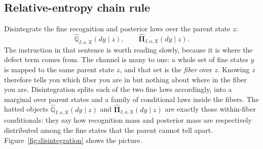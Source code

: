 \documentclass[11pt,letterpaper]{article}
\newcommand{\Rec}{\mathbb Q}
\newcommand{\Post}{\boldsymbol\Pi}
\begin{document}
\subsection{Relative-entropy chain rule}

Disintegrate the fine recognition and posterior laws over the parent state \(z\):
\[
  \widehat{\Rec}_{I,o,X}(dy\mid z),
  \qquad
  \widehat{\Post}_{I,o,X}(dy\mid z).
\]
The instruction in that sentence is worth reading slowly, because it is where the defect term comes from. The channel is many to one: a whole set of fine states \(y\) is mapped to the same parent state \(z\), and that set is the \emph{fiber} over \(z\). Knowing \(z\) therefore tells you which fiber you are in but nothing about where in the fiber you are. Disintegration splits each of the two fine laws accordingly, into a marginal over parent states and a family of conditional laws inside the fibers. The hatted objects \(\widehat{\Rec}_{I,o,X}(dy\mid z)\) and \(\widehat{\Post}_{I,o,X}(dy\mid z)\) are exactly those within-fiber conditionals: they say how recognition mass and posterior mass are respectively distributed among the fine states that the parent cannot tell apart. Figure~\ref{fig:disintegration} shows the picture.
\end{document}
